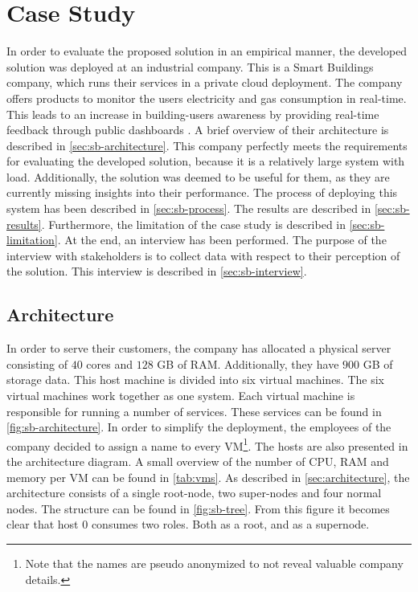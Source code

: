 \chapter{Case Study}\label{ch:case_study}
In order to evaluate the proposed solution in an empirical manner, the developed solution was deployed at an industrial company. This is a Smart Buildings company, which runs their services in a private cloud deployment. The company offers products to monitor the users electricity and gas consumption in real-time. This leads to an increase in building-users awareness by providing real-time feedback through public dashboards \cite{sb}. A brief overview of their architecture is described in \autoref{sec:sb-architecture}. This company perfectly meets the requirements for evaluating the developed solution, because it is a relatively large system with load. Additionally, the solution was deemed to be useful for them, as they are currently missing insights into their performance. The process of deploying this system has been described in \autoref{sec:sb-process}. The results are described in \autoref{sec:sb-results}. Furthermore, the limitation of the case study is  described in \autoref{sec:sb-limitation}. At the end, an interview has been performed. The purpose of the interview with stakeholders is to collect data with respect to their perception of the solution. This interview is described in \autoref{sec:sb-interview}.

\section{Architecture} \label{sec:sb-architecture}
In order to serve their customers, the company has allocated a physical server consisting of $40$ cores and $128$ GB of RAM. Additionally, they have $900$ GB of storage data. This host machine is divided into six virtual machines. The six virtual machines work together as one system. Each virtual machine is responsible for running a number of services. These services can be found in \autoref{fig:sb-architecture}. In order to simplify the deployment, the employees of the company decided to assign a name to every VM\footnote{Note that the names are pseudo anonymized to not reveal valuable company details.}. The hosts are also presented in the architecture diagram. A small overview of the number of CPU, RAM and memory per VM can be found in \autoref{tab:vms}. As described in \autoref{sec:architecture}, the architecture consists of a single root-node, two super-nodes and four normal nodes. The structure can be found in \autoref{fig:sb-tree}. From this figure it becomes clear that host $0$ consumes two roles. Both as a root, and as a supernode.


